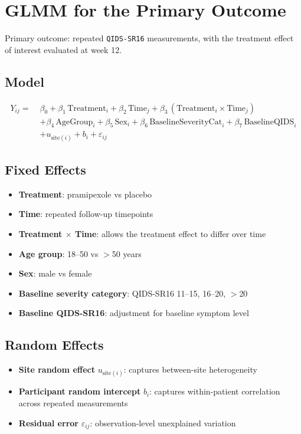 \documentclass[11pt]{article}
\begin{document}
\section*{GLMM for the Primary Outcome}

Primary outcome: repeated \texttt{QIDS-SR16} measurements, with the treatment
effect of interest evaluated at week 12.

\subsection*{Model}

\[
\begin{aligned}
Y_{ij} =\;& \beta_0
+ \beta_1 \,\mathrm{Treatment}_i
+ \beta_2 \,\mathrm{Time}_j
+ \beta_3 \,(\mathrm{Treatment}_i \times \mathrm{Time}_j) \\
& + \beta_4 \,\mathrm{AgeGroup}_i
+ \beta_5 \,\mathrm{Sex}_i
+ \beta_6 \,\mathrm{BaselineSeverityCat}_i
+ \beta_7 \,\mathrm{BaselineQIDS}_i \\
& + u_{\mathrm{site}(i)}
+ b_i
+ \varepsilon_{ij}
\end{aligned}
\]

\subsection*{Fixed Effects}

\begin{itemize}[leftmargin=2em]
\item \textbf{Treatment}: pramipexole vs placebo
\item \textbf{Time}: repeated follow-up timepoints
\item \textbf{Treatment $\times$ Time}: allows the treatment effect to differ over time
\item \textbf{Age group}: 18--50 vs $>$50 years
\item \textbf{Sex}: male vs female
\item \textbf{Baseline severity category}: QIDS-SR16 11--15, 16--20, $>$20
\item \textbf{Baseline QIDS-SR16}: adjustment for baseline symptom level
\end{itemize}

\subsection*{Random Effects}

\begin{itemize}[leftmargin=2em]
\item \textbf{Site random effect} $u_{\mathrm{site}(i)}$:
captures between-site heterogeneity
\item \textbf{Participant random intercept} $b_i$:
captures within-patient correlation across repeated measurements
\item \textbf{Residual error} $\varepsilon_{ij}$:
observation-level unexplained variation
\end{itemize}
\end{document}

